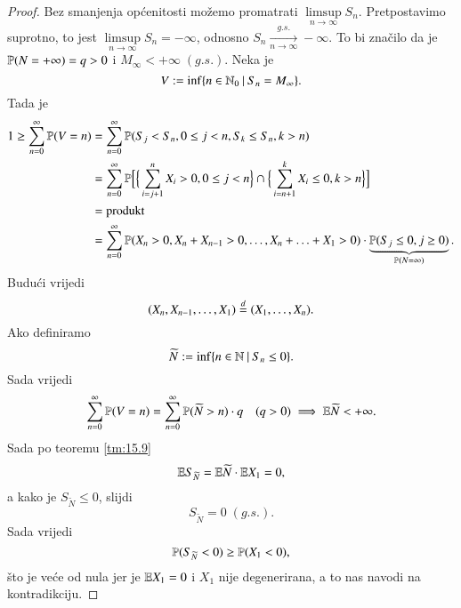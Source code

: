 \begin{proof}
    Bez smanjenja op\' cenitosti mo\v zemo promatrati $\limsup\limits_{n \to \infty} S_n$.
    Pretpostavimo suprotno, to jest $\limsup\limits_{n \to \infty} S_n = -\infty$, odnosno $S_n \xrightarrow[n \to \infty]{g.s.} -\infty$.
    To bi zna\v cilo da je $\mathbb{P} (N = +\infty) = q > 0$ i $M_\infty < +\infty \; (g.s.)$.
    Neka je
    \begin{equation*}
        V := \inf \{{n \in \mathbb{N}_0} \: | \: {S_n = M_\infty}\}.
    \end{equation*}
    Tada je
    \begin{equation*}
        \begin{aligned}
            1 \geq \sum\limits_{n = 0}^{\infty} \mathbb{P} (V = n) &= \sum\limits_{n = 0}^{\infty} \mathbb{P} (S_j < S_n, 0 \leq j < n, S_k \leq S_n, k > n)\\
            &= \sum\limits_{n = 0}^{\infty} \mathbb{P} \Big[ \Big\{ \sum\limits_{i = j + 1}^{n} X_i > 0, 0 \leq j < n \Big\} \cap \Big\{  \sum\limits_{i = n + 1}^{k} X_i \leq 0, k > n \Big\} \Big]\\
            &= \textnormal{produkt}\\
            &= \sum\limits_{n = 0}^{\infty} \mathbb{P} (X_n > 0, X_n + X_{n-1} > 0, \ldots, X_n + \ldots + X_1 > 0) \cdot \underbrace{\mathbb{P} (S_j \leq 0, j \geq 0)}_{\mathbb{P} (N = \infty)}.
        \end{aligned}
    \end{equation*}
    Budu\' ci vrijedi
    \begin{equation*}
        (X_n, X_{n - 1}, \ldots, X_1) \overset{d}{=} (X_1, \ldots, X_n).
    \end{equation*}
    Ako definiramo
    \begin{equation*}
        \widetilde{N} := \inf \{{n \in \mathbb{N}} \: | \: {S_n \leq 0}\}.
    \end{equation*}
    Sada vrijedi
    \begin{equation*}
        \sum\limits_{n = 0}^{\infty} \mathbb{P} (V = n) = \sum\limits_{n = 0}^{\infty} \mathbb{P} (\widetilde{N} > n) \cdot q \quad (q > 0) \implies \mathbb{E} \widetilde{N} < +\infty.
    \end{equation*}
    Sada po teoremu \ref{tm:15.9}
    \begin{equation*}
        \mathbb{E} S_{\widetilde{N}} = \mathbb{E} \widetilde{N} \cdot \mathbb{E} X_1 = 0,
    \end{equation*}
    a kako je $S_{\widetilde{N}} \leq 0$, slijdi
    \begin{equation*}
        S_{\widetilde{N}} = 0 \; (g.s.).
    \end{equation*}
    Sada vrijedi
    \begin{equation*}
        \mathbb{P} (S_{\widetilde{N}} < 0) \geq \mathbb{P} (X_1 < 0), 
    \end{equation*}
    \v sto je ve\' ce od nula jer je $\mathbb{E} X_1 = 0$ i $X_1$ nije degenerirana, a to nas navodi na kontradikciju.
\end{proof}